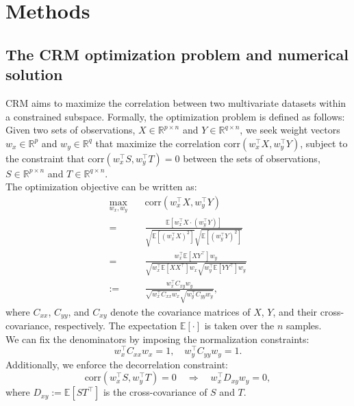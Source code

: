 \documentclass{article}
\begin{document}
\section*{Methods}\label{sec:Methods}

\subsection*{The CRM optimization problem and numerical solution}

CRM aims to maximize the correlation between two multivariate datasets within a constrained subspace. Formally, the optimization problem is defined as follows:\\

Given two sets of observations, $X \in \mathbb{R}^{p \times n}$ and $Y \in \mathbb{R}^{q \times n}$, we seek weight vectors $w_x \in \mathbb{R}^p$ and $w_y \in \mathbb{R}^q$ that maximize the correlation $\text{corr}(w_x^\top X, w_y^\top Y)$, subject to the constraint that $\text{corr}(w_x^\top S, w_y^\top T) = 0$ between the sets of observations, $S \in \mathbb{R}^{p \times n}$ and $T \in \mathbb{R}^{q \times n}$. \\


The optimization objective can be written as:
\begin{align*}
\max_{w_x, w_y} \quad & \text{corr}(w_x^\top X, w_y^\top Y) \\
= \quad & \frac{\mathbb{E}[w_x^\top X \cdot (w_y^\top Y)]}{\sqrt{\mathbb{E}[(w_x^\top X)^2]} \sqrt{\mathbb{E}[(w_y^\top Y)^2]}} \\
= \quad & \frac{w_x^\top \mathbb{E}[XY^\top] w_y}{\sqrt{w_x^\top \mathbb{E}[XX^\top] w_x} \sqrt{w_y^\top \mathbb{E}[YY^\top] w_y}} \\
:= \quad & \frac{w_x^\top C_{xy} w_y}{\sqrt{w_x^\top C_{xx} w_x} \sqrt{w_y^\top C_{yy} w_y}},
\end{align*}
where $C_{xx}$, $C_{yy}$, and $C_{xy}$ denote the covariance matrices of $X$, $Y$, and their cross-covariance, respectively. The expectation $\mathbb{E}[\cdot]$ is taken over the $n$ samples.
\\

We can fix the denominators by imposing the normalization constraints:
\[
w_x^\top C_{xx} w_x = 1, \quad w_y^\top C_{yy} w_y = 1.
\]
Additionally, we enforce the decorrelation constraint:
\[
\text{corr}(w_x^\top S, w_y^\top T) = 0 \quad \Rightarrow \quad w_x^\top D_{xy} w_y = 0,
\]
where $D_{xy} := \mathbb{E}[ST^\top]$ is the cross-covariance of $S$ and $T$.
\\
\end{document}
